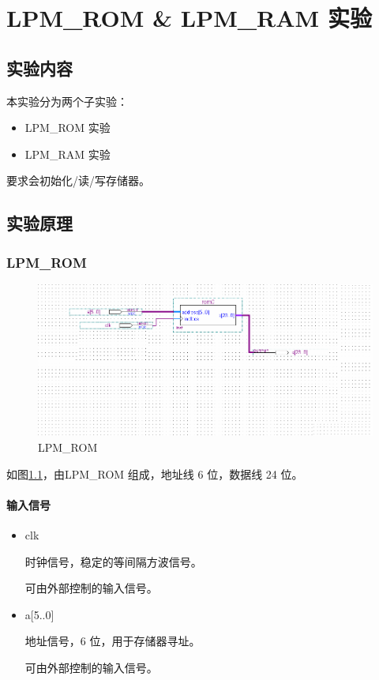 \chapter{LPM\_ROM \& LPM\_RAM 实验}
\section{实验内容}

本实验分为两个子实验：

\begin{itemize}
    \item LPM\_ROM 实验
    \item LPM\_RAM 实验
\end{itemize}

要求会初始化/读/写存储器。

\section{实验原理}

\subsection{LPM\_ROM}

\begin{figure}[H]
\centering
\includegraphics[width=\textwidth]{images/prin2_1.png}
\caption{LPM\_ROM}
\label{fig:prin2_1}
\end{figure}

如图\ref{fig:prin2_1}，由LPM\_ROM 组成，地址线 6 位，数据线 24 位。

\subsubsection{输入信号}

\begin{itemize}
    \item clk
    
    时钟信号，稳定的等间隔方波信号。

    可由外部控制的输入信号。
    
    \item a[5..0]
    
    地址信号，6 位，用于存储器寻址。
    
    可由外部控制的输入信号。
    
\end{itemize} 

